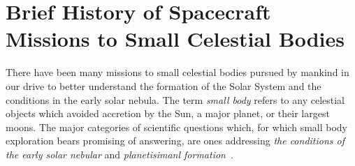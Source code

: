 





\cite{Marks2022}




%


\section{Brief History of Spacecraft Missions to Small Celestial Bodies}

There have been many missions to small celestial bodies pursued by mankind in
our drive to better understand the formation of the Solar System and the
conditions in the early solar nebula. The term \textit{small body} refers to any
celestial objects which avoided accretion by the Sun, a major planet, or their
largest moons. The major categories of scientific questions which, for which
small body exploration bears promising of answering, are ones addressing
\textit{the conditions of the early solar nebular} and \textit{planetisimanl
formation}~\cite{Davidsson2021}.
